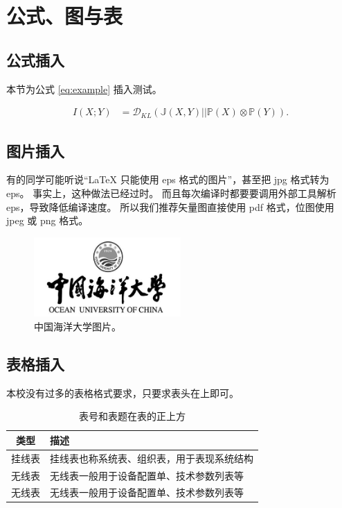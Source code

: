 \chapter{公式、图与表}

\section{公式插入}
本节为公式 \ref{eq:example} 插入测试。

\begin{equation}
\begin{split}
I(X;Y)&=\mathcal{D}_{KL}(\mathbb{J}(X,Y)||\mathbb{P}(X)\otimes\mathbb{P}(Y)).
\end{split}
\label{eq:example}
\end{equation}

\section{图片插入}
有的同学可能听说“\LaTeX{} 只能使用 eps 格式的图片”，甚至把 jpg 格式转为 eps。
事实上，这种做法已经过时。
而且每次编译时都要要调用外部工具解析 eps，导致降低编译速度。
所以我们推荐矢量图直接使用 pdf 格式，位图使用 jpeg 或 png 格式。
\begin{figure}[ht]
    \centering
	\includegraphics[width=0.5\textwidth]{./img/ouclogo}
	\caption{中国海洋大学图片。}
	\label{fig:ouc}
\end{figure}

\section{表格插入}

本校没有过多的表格格式要求，只要求表头在上即可。

\begin{table}[htb]
  \centering\small
  \caption{表号和表题在表的正上方}
  \label{tab:exampletable}
  \begin{tabular}{cl}
    \toprule
    类型   & 描述                                       \\
    \midrule
    挂线表 & 挂线表也称系统表、组织表，用于表现系统结构 \\
    无线表 & 无线表一般用于设备配置单、技术参数列表等   \\
    无线表 & 无线表一般用于设备配置单、技术参数列表等   \\
    \bottomrule
  \end{tabular}
\end{table}

